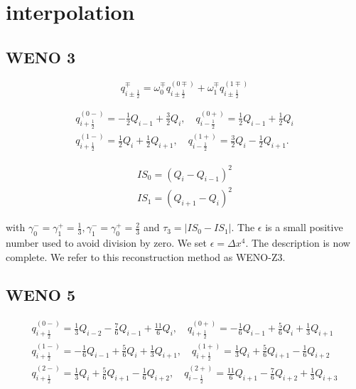 \section{interpolation}
\subsection{WENO 3}

\begin{equation}
q_{i \pm \frac{1}{2}}^{\mp}=\omega_{0}^{\mp} q_{i \pm \frac{1}{2}}^{(0 \mp)}+\omega_{1}^{\mp} q_{i \pm \frac{1}{2}}^{(1 \mp)}
\end{equation}

\begin{equation}
\begin{array}{ll}
q_{i+\frac{1}{2}}^{(0-)}  =-\frac{1}{2} Q_{i-1}+\frac{3}{2} Q_{i},\quad  q_{i-\frac{1}{2}}^{(0+)}=\frac{1}{2} Q_{i-1}+\frac{1}{2} Q_{i} \\
q_{i+\frac{1}{2}}^{(1-)}  =\frac{1}{2} Q_{i}+\frac{1}{2} Q_{i+1}, \quad q_{i-\frac{1}{2}}^{(1+)}=\frac{3}{2} Q_{i}-\frac{1}{2} Q_{i+1} .
\end{array}
\end{equation}

\begin{equation}
\begin{array}{l}
I S_{0}=\left(Q_{i}-Q_{i-1}\right)^{2} \\
I S_{1}=\left(Q_{i+1}-Q_{i}\right)^{2}
\end{array}
\end{equation}

with $\gamma_{0}^{-}=\gamma_{1}^{+}=\frac{1}{3}, \gamma_{1}^{-}=\gamma_{0}^{+}=\frac{2}{3}$ and $\tau_{3}=\left|I S_{0}-I S_{1}\right| .$ The $\epsilon$ is a
small positive number used to avoid division by zero. We set $\epsilon=\Delta x^{4}$. The description is now complete. We refer to this reconstruction method as WENO-Z3.

\subsection{WENO 5}

\begin{equation}
\begin{array}{ll}
q_{i+\frac{1}{2}}^{(0-)}  =\frac{1}{3} Q_{i-2}-\frac{7}{6} Q_{i-1}+\frac{11}{6} Q_{i},\quad  q_{i+\frac{1}{2}}^{(0+)}=-\frac{1}{6} Q_{i-1}+\frac{5}{6} Q_{i}+\frac{1}{3} Q_{i+1} \\
q_{i+\frac{1}{2}}^{(1-)}  =-\frac{1}{6} Q_{i-1}+\frac{5}{6} Q_{i}+\frac{1}{3} Q_{i+1}, \quad  q_{i+\frac{1}{2}}^{(1+)}=\frac{1}{3} Q_{i}+\frac{5}{6} Q_{i+1}-\frac{1}{6} Q_{i+2} \\
q_{i+\frac{1}{2}}^{(2-)}  =\frac{1}{3} Q_{i}+\frac{5}{6} Q_{i+1}-\frac{1}{6} Q_{i+2}, \quad q_{i-\frac{1}{2}}^{(2+)}=\frac{11}{6} Q_{i+1}-\frac{7}{6} Q_{i+2}+\frac{1}{3} Q_{i+3}
\end{array}
\end{equation}


